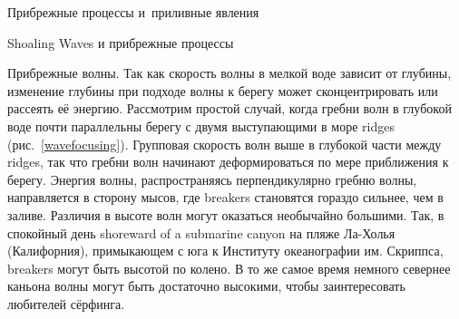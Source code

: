 \begin{chapter}{Прибрежные процессы и~приливные явления}
\begin{section}{Shoaling Waves и прибрежные процессы}
\begin{paragraph}{Прибрежные волны.}
Так как скорость волны в мелкой воде зависит от глубины,
изменение глубины при подходе волны к берегу может сконцентрировать или
рассеять её энергию. Рассмотрим простой случай, когда гребни волн 
в глубокой воде почти параллельны берегу с двумя выступающими в море ridges
(рис.~\ref{wavefocusing}). Групповая скорость волн выше
в глубокой части между ridges, так что гребни волн начинают деформироваться
по мере приближения к берегу. Энергия волны, распространяясь
перпендикулярно гребню волны, направляется в сторону мысов, где 
breakers становятся гораздо сильнее, чем в заливе. 
Различия в высоте волн могут оказаться необычайно большими. Так, в спокойный 
день shoreward of a submarine canyon на пляже Ла-Холья (Калифорния), 
примыкающем с юга к Институту океанографии им. Скриппса, 
breakers могут быть высотой по колено. В то же самое время немного севернее
каньона волны могут быть достаточно высокими, чтобы заинтересовать
любителей сёрфинга.
%
\end{paragraph}


\end{section}
\end{chapter}
